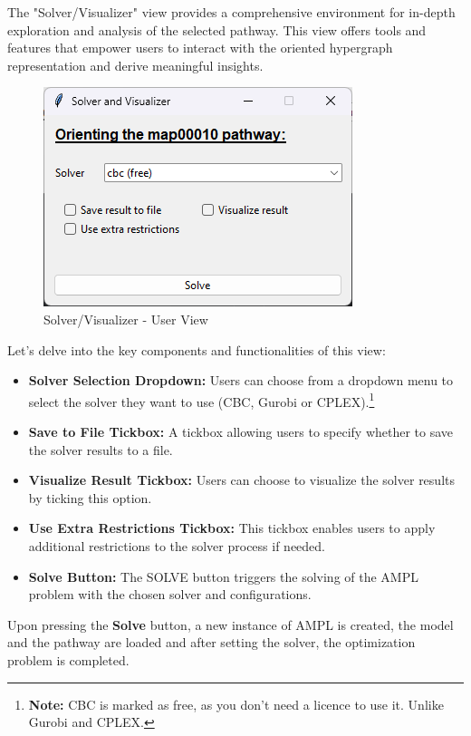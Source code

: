 The "Solver/Visualizer" view provides a comprehensive environment for in-depth exploration and analysis of the selected pathway. This view offers tools and features that empower users to interact with the oriented hypergraph representation and derive meaningful insights. 

\begin{figure}[H]
    \centering
    \includegraphics{Design of the User Interface/solver_visualizer.png}
    \caption{Solver/Visualizer - User View}
    \label{fig:solver_visualizer}
\end{figure}

Let's delve into the key components and functionalities of this view:
\begin{itemize}
    \item \textbf{Solver Selection Dropdown:} Users can choose from a dropdown menu to select the solver they want to use (CBC, Gurobi or CPLEX).\footnote{\textbf{Note:} CBC is marked as free, as you don't need a licence to use it. Unlike Gurobi and CPLEX.}
    \item \textbf{Save to File Tickbox:} A tickbox allowing users to specify whether to save the solver results to a file.
    \item \textbf{Visualize Result Tickbox:} Users can choose to visualize the solver results by ticking this option.
    \item \textbf{Use Extra Restrictions Tickbox:} This tickbox enables users to apply additional restrictions to the solver process if needed.
    \item \textbf{Solve Button:} The SOLVE button triggers the solving of the AMPL problem with the chosen solver and configurations.
\end{itemize}

Upon pressing the \textbf{Solve} button, a new instance of AMPL is created, the model and the pathway are loaded and after setting the solver, the optimization problem is completed. 

